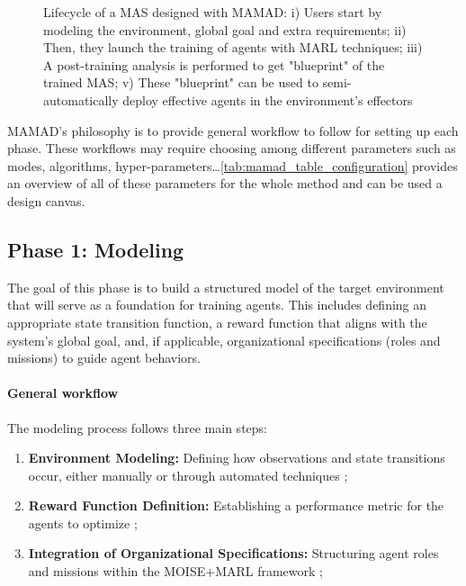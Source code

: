\documentclass[journal]{IEEEtai}
\begin{document}


\begin{figure}[h!]
  \centering
  
  \caption{Lifecycle of a MAS designed with MAMAD: i) Users start by modeling the environment, global goal and extra requirements; \quad ii) Then, they launch the training of agents with MARL techniques; \quad iii) A post-training analysis is performed to get "blueprint" of the trained MAS; \quad v) These "blueprint" can be used to semi-automatically deploy effective agents in the environment's effectors}
  \label{fig:cycle}
\end{figure}

MAMAD's philosophy is to provide general workflow to follow for setting up each phase. These workflows may require choosing among different parameters such as modes, algorithms, hyper-parameters\dots \autoref{tab:mamad_table_configuration} provides an overview of all of these parameters for the whole method and can be used a design canvas.



\subsection{Phase 1: Modeling}

The goal of this phase is to build a structured model of the target environment that will serve as a foundation for training agents. This includes defining an appropriate state transition function, a reward function that aligns with the system's global goal, and, if applicable, organizational specifications (roles and missions) to guide agent behaviors.

\paragraph{\textbf{General workflow}}
The modeling process follows three main steps:
\begin{enumerate}
    \item \textbf{Environment Modeling:} Defining how observations and state transitions occur, either manually or through automated techniques ;
    \item \textbf{Reward Function Definition:} Establishing a performance metric for the agents to optimize ;
    \item \textbf{Integration of Organizational Specifications:} Structuring agent roles and missions within the MOISE+MARL framework ;
\end{enumerate}
\end{document}
